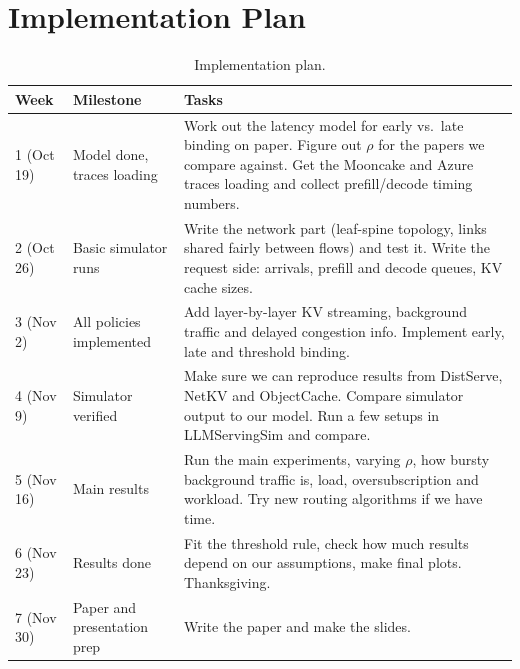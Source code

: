 \documentclass[a4paper]{article}
\begin{document}
\section{Implementation Plan}
\begingroup
\renewcommand{\arraystretch}{1.25}
\begin{longtable}{|l|>{\raggedright\arraybackslash}p{3cm}|>{\raggedright\arraybackslash}p{\dimexpr\linewidth-5.6cm\relax}|}
\caption{Implementation plan.} \\
\hline
Week & Milestone & Tasks \\
\hline
1 (Oct 19) & Model done, traces loading & Work out the latency model for early vs.\ late binding on paper. Figure out $\rho$ for the papers we compare against. Get the Mooncake and Azure traces loading and collect prefill/decode timing numbers. \\
\hline
2 (Oct 26) & Basic simulator runs & Write the network part (leaf-spine topology, links shared fairly between flows) and test it. Write the request side: arrivals, prefill and decode queues, KV cache sizes. \\
\hline
3 (Nov 2) & All policies implemented & Add layer-by-layer KV streaming, background traffic and delayed congestion info. Implement early, late and threshold binding. \\
\hline
4 (Nov 9) & Simulator verified & Make sure we can reproduce results from DistServe, NetKV and ObjectCache. Compare simulator output to our model. Run a few setups in LLMServingSim and compare. \\
\hline
5 (Nov 16) & Main results & Run the main experiments, varying $\rho$, how bursty background traffic is, load, oversubscription and workload. Try new routing algorithms if we have time. \\
\hline
6 (Nov 23) & Results done & Fit the threshold rule, check how much results depend on our assumptions, make final plots. Thanksgiving. \\
\hline
7 (Nov 30) & Paper and presentation prep & Write the paper and make the slides. \\
\hline
\end{longtable}



\end{document}
